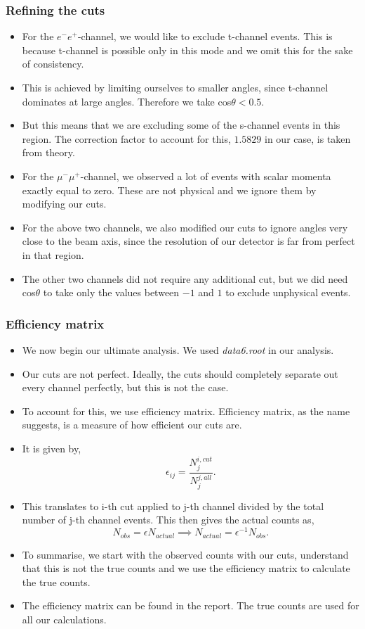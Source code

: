 \documentclass[10pt]{beamer}
\begin{document}
\begin{frame}
\frametitle{Refining the cuts}
\begin{itemize}
  \item For the $e^-e^+$-channel, we would like to exclude t-channel events. This is because t-channel is possible only in this mode and we omit this for the sake of consistency.
  \item This is achieved by limiting ourselves to smaller angles, since t-channel dominates at large angles. Therefore we take cos$\theta < 0.5$.
  \item But this means that we are excluding some of the s-channel events in this region. The correction factor to account for this, $1.5829$ in our case, is taken from theory.
  \item For the $\mu^-\mu^+$-channel, we observed a lot of events with scalar momenta exactly equal to zero. These are not physical and we ignore them by modifying our cuts.
  \item For the above two channels, we also modified our cuts to ignore angles very close to the beam axis, since the resolution of our detector is far from perfect in that region.
  \item The other two channels did not require any additional cut, but we did need cos$\theta$ to take only the values between $-1$ and $1$ to exclude unphysical events.
\end{itemize}
\end{frame}

\begin{frame}
\frametitle{Efficiency matrix}
\begin{itemize}
  \item We now begin our ultimate analysis. We used \textit{data6.root} in our analysis.
  \item Our cuts are not perfect. Ideally, the cuts should completely separate out every channel perfectly, but this is not the case.
  \item To account for this, we use efficiency matrix. Efficiency matrix, as the name suggests, is a measure of how efficient our cuts are.
  \item It is given by,
  \begin{equation}
    \epsilon_{ij} = \frac{N^{i, cut}_j}{N^{j, all}_j}.
  \end{equation}
  \item This translates to i-th cut applied to j-th channel divided by the total number of j-th channel events. This then gives the actual counts as,
  \begin{equation}
    N_{obs} = \epsilon N_{actual} \implies N_{actual} = \epsilon^{-1} N_{obs}.
  \end{equation}
  \item To summarise, we start with the observed counts with our cuts, understand that this is not the true counts and we use the efficiency matrix to calculate the true counts.
  \item The efficiency matrix can be found in the report. The true counts are used for all our calculations.
\end{itemize}
\end{frame}
\end{document}
